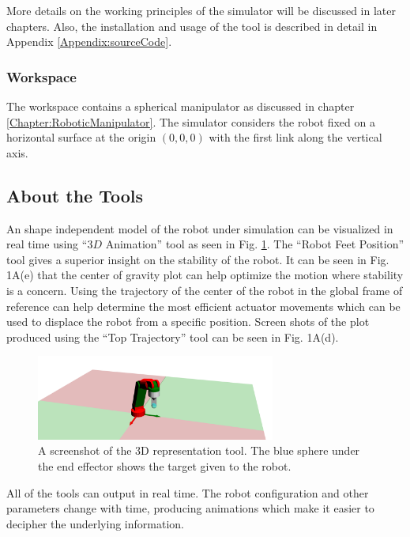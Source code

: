 {    More details on the working principles of the simulator will be discussed in later chapters. Also, the installation and usage of the tool is described in detail in Appendix \ref{Appendix:sourceCode}.

    \subsubsection{Workspace}
    The workspace contains a spherical manipulator as discussed in chapter \ref{Chapter:RoboticManipulator}. The simulator considers the robot fixed on a horizontal surface at the origin $(0, 0, 0)$ with the first link along the vertical axis.

    \subsection{About the Tools}

    An shape independent model of the robot under simulation can be visualized in real time using ``$3D$ Animation'' tool as seen in Fig. \ref{Fig3D}. The ``Robot Feet Position'' tool gives a superior insight on the stability of the robot. It can be seen in Fig. 1A(e) that the center of gravity plot can help optimize the motion where stability is a concern. Using the trajectory of the center of the robot in the global frame of reference can help determine the most efficient actuator movements which can be used to displace the robot from a specific position. Screen shots of the plot produced using the ``Top Trajectory'' tool can be seen in Fig. 1A(d).


        \begin{figure}
          \centering
          \includegraphics[width=0.7\textwidth]{../Images/3D.png}
          \caption{A screenshot of the $3$D representation tool. The blue sphere under the end effector shows the target given to the robot.
          } \label{Fig3D}
        \end{figure}

    All of the tools can output in real time. The robot configuration and other parameters change with time, producing animations which make it easier to decipher the underlying information.

}
